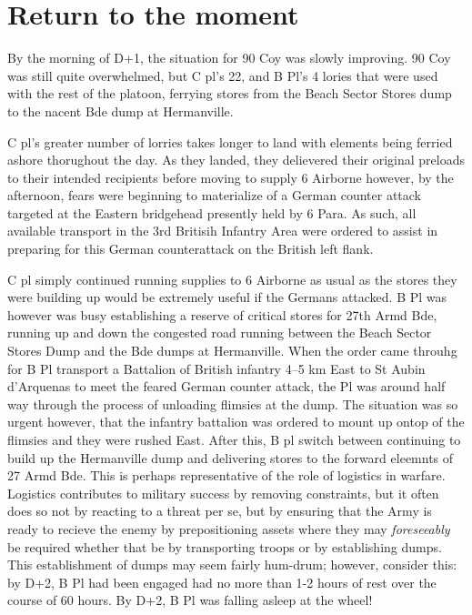 \documentclass[noraggedright]{turabian-researchpaper}
\begin{document}

\section{Return to the moment} %

By the morning of D+1, the situation for 90 Coy was slowly improving.  90 Coy 
was still quite overwhelmed, but C pl's 22, and B Pl's 4 lories that were used
with the rest of the platoon, ferrying stores from the Beach Sector Stores 
dump to the nacent Bde dump at Hermanville.  

C pl's greater number of lorries takes longer to land with elements being 
ferried ashore thorughout the day.  As they landed, they delievered their
original preloads to their intended recipients before moving to supply 
6 Airborne however, by the afternoon, fears were beginning to materialize of
a German counter attack targeted at the Eastern bridgehead presently held by
6 Para.  As such, all available transport in the 3rd Britisih Infantry Area
were ordered to assist in preparing for this German counterattack on the 
British left flank.  

C pl simply continued running supplies to 6 Airborne
as usual as the stores they were building up would be extremely useful if
the Germans attacked.   B Pl was however was busy establishing a reserve of 
critical stores for 27th Armd Bde, running up and down the congested road 
running between the Beach Sector Stores Dump and the Bde dumps at Hermanville.
When the order came throuhg for B Pl transport a Battalion of British infantry
4--5 km East to St Aubin d'Arquenas to meet the feared German counter 
attack, the Pl was around half way through the process of unloading flimsies 
at the dump.  The situation was so urgent however, that the infantry battalion
was ordered to mount up ontop of the flimsies and they were rushed East.  After
this, B pl switch between continuing to build up the Hermanville dump and 
delivering stores to the forward eleemnts of 27 Armd Bde.  This is perhaps 
representative of the role of logistics in warfare.  Logistics contributes to
military success by removing constraints, but it often does so not by reacting
to a threat per se, but by ensuring that the Army is ready to recieve the 
enemy by prepositioning assets where they may \textit{foreseeably} be 
required whether that be by transporting troops or by establishing dumps.  
This establishment of dumps may seem fairly hum-drum; however, consider this:
by D+2, B Pl had been engaged had no more than 1-2 hours of rest over the 
course of 60 hours.  By D+2, B Pl was falling asleep at the wheel!  
\end{document}
